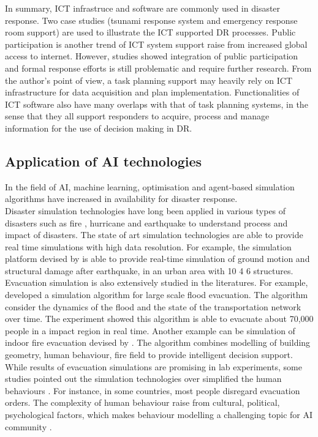 In summary, ICT infrastruce and software are commonly used in disaster response. Two case studies (tsunami response system and emergency response room support) are used to illustrate the ICT supported DR processes. Public participation is another trend of ICT system support raise from increased global access to internet. However, studies showed integration of public participation and formal response efforts is still problematic and require further research. From the author's point of view, a task planning support may heavily rely on ICT infrastructure for data acquisition and plan implementation. Functionalities of ICT software also have many overlaps with that of task planning systems, in the sense that they all support responders to acquire, process and manage information for the use of decision making in DR. \\


\subsection{Application of AI technologies}\label{sec:lraisupport}
In the field of AI, machine learning, optimisation and agent-based simulation algorithms have increased in availability for disaster response. \\

Disaster simulation technologies \cite{Okaya,Scerri2005} have long been applied in various types of disasters such as fire \cite{Tang2012}, hurricane \cite{Vickery2009} and earthquake\cite{Sobhaninejad2011} to understand process and impact of disasters. The state of art simulation technologies are able to provide real time simulations with high data resolution. For example, the simulation platform devised by \cite{Sobhaninejad2011} is able to provide real-time simulation of ground motion and structural damage after earthquake, in an urban area with 10 4 6 structures. \\

Evacuation simulation is also extensively studied in the literatures. For example, \cite{Pillac2015} developed a simulation algorithm for large scale flood evacuation. The algorithm consider the dynamics of the flood and the state of the transportation network over time. The experiment showed this algorithm is able to evacuate about 70,000 people in a impact region in real time.  Another example can be simulation of indoor fire evacuation devised by \cite{Tang2012}.  The algorithm combines modelling of building geometry, human behaviour, fire field to provide intelligent decision support. While results of evacuation simulations are promising in lab experiments, some studies pointed out the simulation technologies over simplified the human behaviours \cite{Hentenryck2011}. For instance, in some countries, most people disregard evacuation orders. The complexity of human behaviour raise from cultural, political, psychological factors, which makes behaviour modelling a challenging topic for AI community \cite{Provitolo2011} . \\

